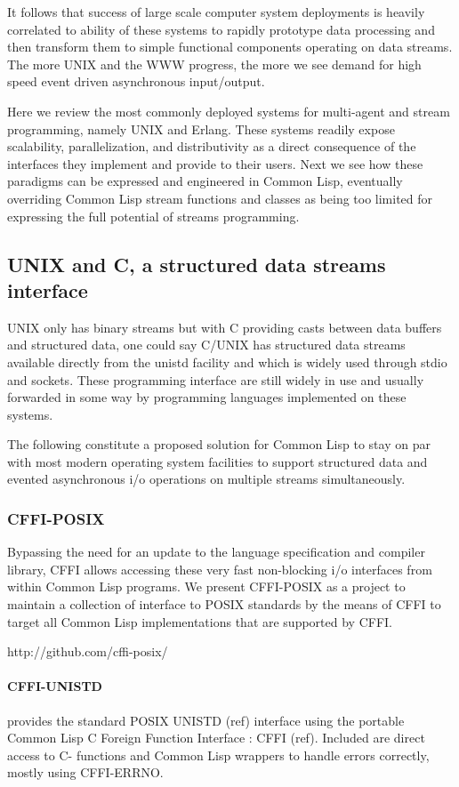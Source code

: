 \documentclass[sigconf]{acmart}
\begin{document}
It follows that success of large scale computer system deployments is
heavily correlated to ability of these systems to rapidly prototype
data processing and then transform them to simple functional
components operating on data streams. The more UNIX and the WWW
progress, the more we see demand for high speed event driven
asynchronous input/output.

Here we review the most commonly deployed systems for multi-agent and
stream programming, namely UNIX and Erlang. These systems readily
expose scalability, parallelization, and distributivity as a direct
consequence of the interfaces they implement and provide to their
users. Next we see how these paradigms can be expressed and engineered
in Common Lisp, eventually overriding Common Lisp stream functions and
classes as being too limited for expressing the full potential of
streams programming.

\subsection{UNIX and C, a structured data streams interface}
UNIX only has binary streams but with C providing casts between data
buffers and structured data, one could say C/UNIX has structured data
streams available directly from the unistd facility and which is
widely used through stdio and sockets. These programming interface are
still widely in use and usually forwarded in some way by programming
languages implemented on these systems.

The following constitute a proposed solution for Common Lisp to stay
on par with most modern operating system facilities to support
structured data and evented asynchronous i/o operations on multiple
streams simultaneously.

\subsubsection{CFFI-POSIX}
Bypassing the need for an update to the language specification and
compiler library, CFFI allows accessing these very fast non-blocking
i/o interfaces from within Common Lisp programs. We present CFFI-POSIX
as a project to maintain a collection of interface to POSIX standards
by the means of CFFI to target all Common Lisp implementations that
are supported by CFFI.

http://github.com/cffi-posix/

\paragraph{CFFI-UNISTD}
provides the standard POSIX UNISTD (ref) interface using the
portable Common Lisp C Foreign Function Interface : CFFI (ref). Included
are direct access to C- functions and Common Lisp wrappers to handle
errors correctly, mostly using CFFI-ERRNO.
\end{document}
